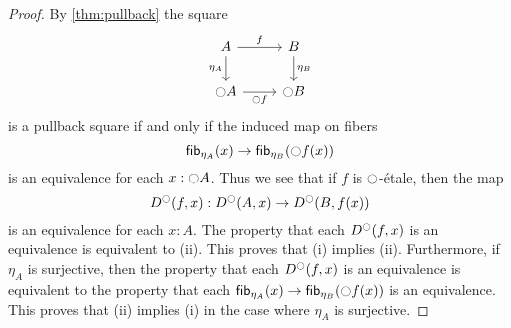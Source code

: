 \documentclass[9pt,twosided]{amsart}
\begin{document}
\begin{proof}
  By \cref{thm:pullback} the square
  \begin{equation*}
    \begin{tikzcd}
      A \arrow[r,"f"] \arrow[d,swap,"\eta_A"] & B \arrow[d,"\eta_B"] \\
      \modal A \arrow[r,swap,"\modal f"] & \modal B
    \end{tikzcd}
  \end{equation*}
  is a pullback square if and only if the induced map on fibers
  \begin{equation*}
    \fib{\eta_A}{x}\to \fib{\eta_B}{\modal f(x)}
  \end{equation*}
  is an equivalence for each $x:{\ocircle} A$. Thus we see that if $f$ is ${\ocircle}$-\'etale, then the map
  \begin{equation*}
    D^{\ocircle}(f,x) : D^{\ocircle}(A,x)\to D^{\ocircle}(B,f(x))
  \end{equation*}
  is an equivalence for each $x:A$. The property that each $D^{\ocircle}(f,x)$ is an equivalence is equivalent to (ii). This proves that (i) implies (ii). Furthermore, if $\eta_A$ is surjective, then the property that each $D^{\ocircle}(f,x)$ is an equivalence is equivalent to the property that each $\fib{\eta_A}{x}\to \fib{\eta_B}{\modal f(x)}$ is an equivalence. This proves that (ii) implies (i) in the case where $\eta_A$ is surjective.
\end{proof}

\begin{comment}%
\begin{cor}
If $f:A\to B$ is $\modal$-\'etale, then the square
\begin{equation*}
\begin{tikzcd}[column sep=large]
A \arrow[d,swap,"\delta_{\modalunit}"] \arrow[r,"f"] & B \arrow[d,"\delta_{\modalunit}"] \\
A\times_{\modal A} A \arrow[r,swap,"f\times_{\modal f}f"] & B\times_{\modal B} B
\end{tikzcd}
\end{equation*}
is a pullback square.
\end{cor}

\begin{proof}
Consider the diagram
\begin{equation*}
\begin{tikzcd}[column sep=large]
A \arrow[d,swap,"\delta_{\modalunit}"] \arrow[r,"f"] & B \arrow[d,"\delta_{\modalunit}"] \\
A\times_{\modal A} A \arrow[d,swap,"\proj 1"] \arrow[r,"{f\times_{\modal f} f}"] & B\times_{\modal B} B \arrow[d,"\proj 1"] \\
A \arrow[r,"f"] & B
\end{tikzcd}
\end{equation*}
The bottom square is a pullback square by \cref{lem:etale_char}, and the outer rectangle is a pullback since both vertical composites are homotopic to the respective identity functions. Therefore the top square is a pullback.
\end{proof}
\end{comment}
\end{document}
